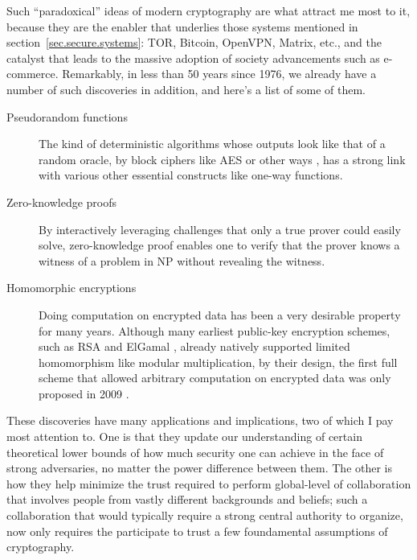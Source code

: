 \documentclass[10pt]{article}
\begin{document}
Such ``paradoxical'' ideas of modern cryptography are what attract me most to
it, because they are the enabler that underlies those systems mentioned in
section~\ref{sec.secure.systems}: TOR, Bitcoin, OpenVPN, Matrix, etc., and the
catalyst that leads to the massive adoption of society advancements such as
e-commerce. Remarkably, in less than 50 years since 1976, we already have a
number of such discoveries in addition, and here's a list of some of them.
\begin{description}
\item[Pseudorandom functions] The kind of deterministic algorithms
	whose outputs look like that of a random oracle, by block ciphers like
	AES\cite{aes} or other ways \cite{pseudo.rand.cons.2}, has a strong link
	with various other essential constructs like one-way functions.

\item[Zero-knowledge proofs] By interactively leveraging challenges that only a
	true prover could easily solve, zero-knowledge proof \cite{zero.knowledge}
	enables one to verify that the prover knows a witness of a problem in NP
	\cite{zero.knowledge.np} without revealing the witness.

\item[Homomorphic encryptions] Doing computation on encrypted data has been a
	very desirable property for many years. Although many earliest public-key
	encryption schemes, such as RSA \cite{rsa} and ElGamal \cite{elgamal},
	already natively supported limited homomorphism like modular
	multiplication, by their design, the first full scheme that allowed
	arbitrary computation on encrypted data was only proposed in 2009
	\cite{first.full.homo}.
\end{description}

These discoveries have many applications and implications, two of which I pay
most attention to. One is that they update our understanding of certain
theoretical lower bounds of how much security one can achieve in the face of
strong adversaries, no matter the power difference between them. The other is
how they help minimize the trust required to perform global-level of
collaboration that involves people from vastly different backgrounds and
beliefs; such a collaboration that would typically require a strong central
authority to organize, now only requires the participate to trust a few
foundamental assumptions of cryptography.
\end{document}
